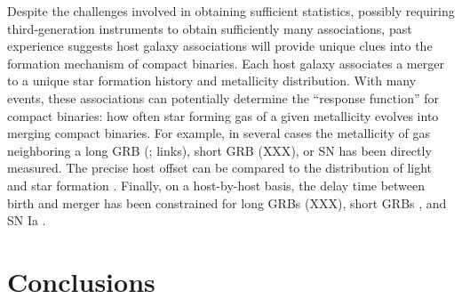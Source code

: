 \documentclass[nofootinbib,twocolumn,prd]{emulateapj}
\newcommand\editremark[1]{{\color{red}#1}}
\begin{document}
Despite the challenges involved in obtaining sufficient statistics, possibly requiring third-generation instruments to
obtain sufficiently many associations, past experience suggests  host galaxy associations
will provide unique clues into the formation mechanism of compact binaries.
% 
Each host galaxy associates a merger to a unique star formation history and metallicity distribution.
With many events, these associations can potentially determine the ``response function'' for compact binaries: how often star forming gas of a given metallicity evolves into
merging compact binaries.    
%
For example, in several cases the metallicity of gas neighboring a long GRB (\citet{ 2008AJ....135.1136M}; \citet{2010AJ....140.1557L}
\editremark{links}), short GRB (\editremark{XXX}), or SN has been directly measured.
%
The precise host offset can be compared to the distribution of light and star formation  \citep{2010ApJ...708....9F}.
%
Finally,  on a host-by-host basis, the delay time between birth and merger has been constrained for long GRBs (\editremark{XXX}), short GRBs \citep{2010ApJ...725.1202L}, and
  SN Ia \citep{2011MNRAS.412.1508M}.  
%










\section{Conclusions}
\label{sec:conclude}
\end{document}

